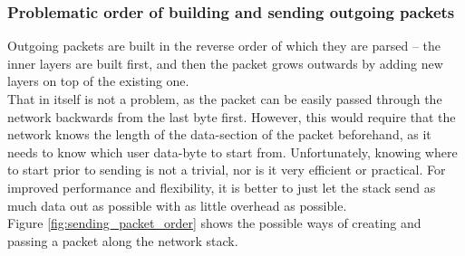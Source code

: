 \subsubsection{Problematic order of building and sending outgoing packets}
Outgoing packets are built in the reverse order of which they are parsed -- the 
inner layers are built first, and then the packet grows outwards by adding new 
layers on top of the existing one.\\
That in itself is not a problem, as the packet can be easily passed through the 
network backwards from the last byte first.
However, this would require that the network knows the length of the data-section
of the packet beforehand, as it needs to know which user data-byte to start from.
Unfortunately, knowing where to start prior to sending is not a trivial, nor is 
it very efficient or practical. 
For improved performance and flexibility, it is better to just let the 
stack send as much data out as possible with as little overhead as possible.\\
Figure \ref{fig:sending_packet_order} shows the possible ways of creating and 
passing a packet along the network stack. 
